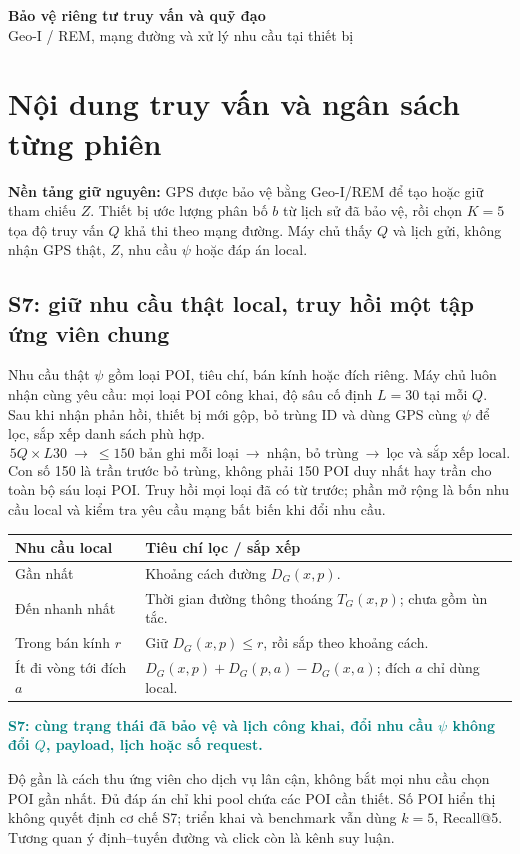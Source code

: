 \documentclass[10pt,a4paper]{article}
\newcommand{\key}[1]{\par\smallskip\noindent\textcolor{teal}{\textbf{#1}}\par\smallskip}
\begin{document}
\begin{center}
{\LARGE\bfseries\color{ink}Bảo vệ riêng tư truy vấn và quỹ đạo}\\[3pt]
{\large Geo-I / REM, mạng đường và xử lý nhu cầu tại thiết bị}
\end{center}

\section{Nội dung truy vấn và ngân sách từng phiên}
\textbf{Nền tảng giữ nguyên:} GPS được bảo vệ bằng Geo-I/REM để tạo hoặc giữ tham chiếu $Z$.
Thiết bị ước lượng phân bố $b$ từ lịch sử đã bảo vệ, rồi chọn $K=5$ tọa độ truy vấn $Q$ khả thi theo mạng đường.
Máy chủ thấy $Q$ và lịch gửi, không nhận GPS thật, $Z$, nhu cầu $\psi$ hoặc đáp án local.

\subsection{S7: giữ nhu cầu thật local, truy hồi một tập ứng viên chung}
Nhu cầu thật $\psi$ gồm loại POI, tiêu chí, bán kính hoặc đích riêng. Máy chủ luôn nhận cùng yêu cầu:
mọi loại POI công khai, độ sâu cố định $L=30$ tại mỗi $Q$. Sau khi nhận phản hồi, thiết bị mới gộp,
bỏ trùng ID và dùng GPS cùng $\psi$ để lọc, sắp xếp danh sách phù hợp.
\[
5Q\times L30\ \longrightarrow\ \leq150\text{ bản ghi mỗi loại}
\ \longrightarrow\ \text{nhận, bỏ trùng}\ \longrightarrow\ \text{lọc và sắp xếp local}.
\]
Con số 150 là trần trước bỏ trùng, không phải 150 POI duy nhất hay trần cho toàn bộ sáu loại POI.
Truy hồi mọi loại đã có từ trước; phần mở rộng là bốn nhu cầu local và kiểm tra yêu cầu mạng bất biến khi đổi nhu cầu.

\par\smallskip
\begin{tabularx}{\linewidth}{@{}P{3.4cm}Y@{}}\toprule
\textbf{Nhu cầu local} & \textbf{Tiêu chí lọc / sắp xếp}\\\midrule
Gần nhất & Khoảng cách đường $D_G(x,p)$.\\
Đến nhanh nhất & Thời gian đường thông thoáng $T_G(x,p)$; chưa gồm ùn tắc.\\
Trong bán kính $r$ & Giữ $D_G(x,p)\leq r$, rồi sắp theo khoảng cách.\\
Ít đi vòng tới đích $a$ & $D_G(x,p)+D_G(p,a)-D_G(x,a)$; đích $a$ chỉ dùng local.\\\bottomrule
\end{tabularx}

\key{S7: cùng trạng thái đã bảo vệ và lịch công khai, đổi nhu cầu $\psi$ không đổi $Q$, payload, lịch hoặc số request.}
Độ gần là cách thu ứng viên cho dịch vụ lân cận, không bắt mọi nhu cầu chọn POI gần nhất.
Đủ đáp án chỉ khi pool chứa các POI cần thiết. Số POI hiển thị không quyết định cơ chế S7;
triển khai và benchmark vẫn dùng $k=5$, Recall@5. Tương quan ý định--tuyến đường và click còn là kênh suy luận.
\end{document}
